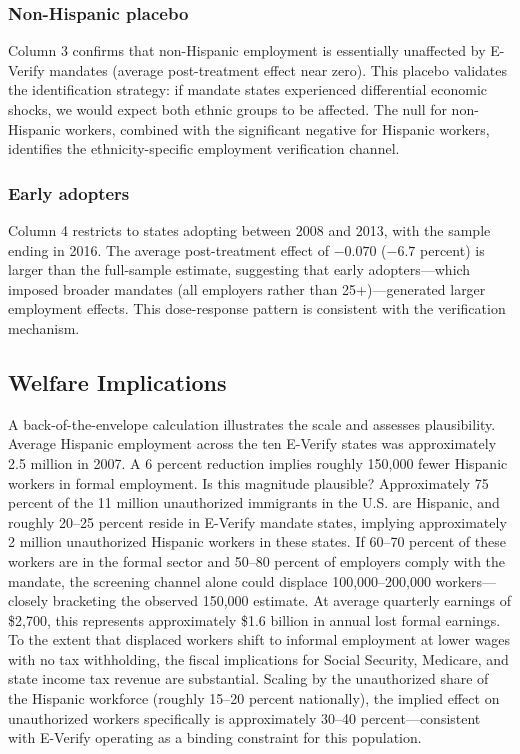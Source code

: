 \documentclass[12pt]{article}
\begin{document}


\subsubsection*{Non-Hispanic placebo} Column 3 confirms that non-Hispanic employment is essentially unaffected by E-Verify mandates (average post-treatment effect near zero). This placebo validates the identification strategy: if mandate states experienced differential economic shocks, we would expect both ethnic groups to be affected. The null for non-Hispanic workers, combined with the significant negative for Hispanic workers, identifies the ethnicity-specific employment verification channel.

\subsubsection*{Early adopters} Column 4 restricts to states adopting between 2008 and 2013, with the sample ending in 2016. The average post-treatment effect of $-0.070$ ($-6.7$ percent) is larger than the full-sample estimate, suggesting that early adopters---which imposed broader mandates (all employers rather than 25+)---generated larger employment effects. This dose-response pattern is consistent with the verification mechanism.

\subsection{Welfare Implications}

A back-of-the-envelope calculation illustrates the scale and assesses plausibility. Average Hispanic employment across the ten E-Verify states was approximately 2.5 million in 2007. A 6 percent reduction implies roughly 150,000 fewer Hispanic workers in formal employment. Is this magnitude plausible? Approximately 75 percent of the 11 million unauthorized immigrants in the U.S. are Hispanic, and roughly 20--25 percent reside in E-Verify mandate states, implying approximately 2 million unauthorized Hispanic workers in these states. If 60--70 percent of these workers are in the formal sector and 50--80 percent of employers comply with the mandate, the screening channel alone could displace 100,000--200,000 workers---closely bracketing the observed 150,000 estimate. At average quarterly earnings of \$2,700, this represents approximately \$1.6 billion in annual lost formal earnings. To the extent that displaced workers shift to informal employment at lower wages with no tax withholding, the fiscal implications for Social Security, Medicare, and state income tax revenue are substantial. Scaling by the unauthorized share of the Hispanic workforce (roughly 15--20 percent nationally), the implied effect on unauthorized workers specifically is approximately 30--40 percent---consistent with E-Verify operating as a binding constraint for this population.
\end{document}
